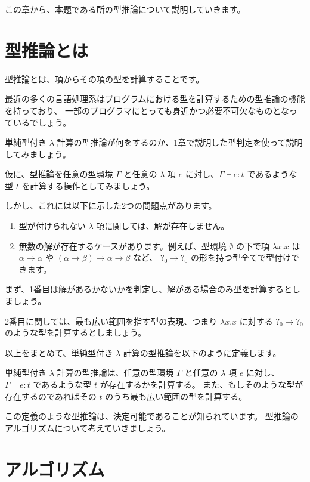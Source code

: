 
この章から、本題である所の型推論について説明していきます。

\section{型推論とは}

型推論とは、項からその項の型を計算することです。

最近の多くの言語処理系はプログラムにおける型を計算するための型推論の機能を持っており、
一部のプログラマにとっても身近かつ必要不可欠なものとなっているでしょう。

単純型付き $\lambda$ 計算の型推論が何をするのか、1章で説明した型判定を使って説明してみましょう。

仮に、型推論を任意の型環境 $\Gamma$ と任意の $\lambda$ 項 $e$ に対し、$\Gamma \vdash e : t$
であるような型 $t$ を計算する操作としてみましょう。

しかし、これには以下に示した2つの問題点があります。

\begin{enumerate}
  \item 型が付けられない $\lambda$ 項に関しては、解が存在しません。
  \item 無数の解が存在するケースがあります。例えば、型環境 $\emptyset$ の下で項 $\lambda x . x$ は
        $\alpha \to \alpha$ や $(\alpha \to \beta) \to \alpha \to \beta$ など、
        $?_0 \to ?_0$ の形を持つ型全てで型付けできます。
\end{enumerate}

まず、1番目は解があるかないかを判定し、解がある場合のみ型を計算するとしましょう。

2番目に関しては、最も広い範囲を指す型の表現、つまり $\lambda x . x$ に対する $?_0 \to ?_0$
のような型を計算するとしましょう。

以上をまとめて、単純型付き $\lambda$ 計算の型推論を以下のように定義します。

\begin{definition}
単純型付き $\lambda$ 計算の型推論は、任意の型環境 $\Gamma$ と任意の $\lambda$ 項 $e$ に対し、
$\Gamma \vdash e : t$ であるような型 $t$ が存在するかを計算する。
また、もしそのような型が存在するのであればその $t$ のうち最も広い範囲の型を計算する。
\end{definition}

この定義のような型推論は、決定可能であることが知られています。
型推論のアルゴリズムについて考えていきましょう。

\section{アルゴリズム}

